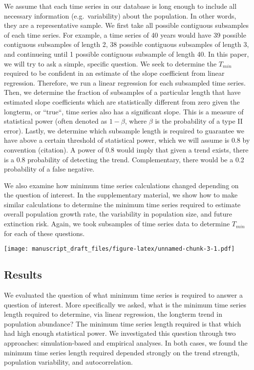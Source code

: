 \documentclass[12pt,]{article}
\begin{document}
We assume that each time series in our database is long enough to
include all necessary information (e.g.~variability) about the
population. In other words, they are a representative sample. We first
take all possible contiguous subsamples of each time series. For
example, a time series of 40 years would have 39 possible contiguous
subsamples of length 2, 38 possible contiguous subsamples of length 3,
and continueing until 1 possible contiguous subsample of length 40. In
this paper, we will try to ask a simple, specific question. We seek to
determine the \(T_{min}\) required to be confident in an estimate of the
slope coefficient from linear regression. Therefore, we run a linear
regression for each subsampled time series. Then, we determine the
fraction of subsamples of a particular length that have estimated slope
coefficients which are statistically different from zero given the
longterm, or ``true``, time series also has a significant slope. This is
a measure of statistical power (often denoted as \(1- \beta\), where
\(\beta\) is the probability of a type II error). Lastly, we determine
which subsample length is required to guarantee we have above a certain
threshold of statistical power, which we will assume is 0.8 by
convention (citation). A power of 0.8 would imply that given a trend
exists, there is a 0.8 probability of detecting the trend.
Complementary, there would be a 0.2 probability of a false negative.

We also examine how minimum time series calculations changed depending
on the question of interest. In the supplementary material, we show how
to make similar calculations to determine the minimum time series
required to estimate overall population growth rate, the variability in
population size, and future extinction risk. Again, we took subsamples
of time series data to determine \(T_{min}\) for each of these
questions.

\texttt{[image: manuscript\_draft\_files/figure-latex/unnamed-chunk-3-1.pdf]}

\subsection{Results}\label{results}

We evaluated the question of what minimum time series is required to
answer a question of interest. More specifically we asked, what is the
minimum time series length required to determine, via linear regression,
the longterm trend in population abundance? The minimum time series
length required is that which had high enough statistical power. We
investigated this question through two approaches: simulation-based and
empirical analyses. In both cases, we found the minimum time series
length required depended strongly on the trend strength, population
variability, and autocorrelation.
\end{document}
